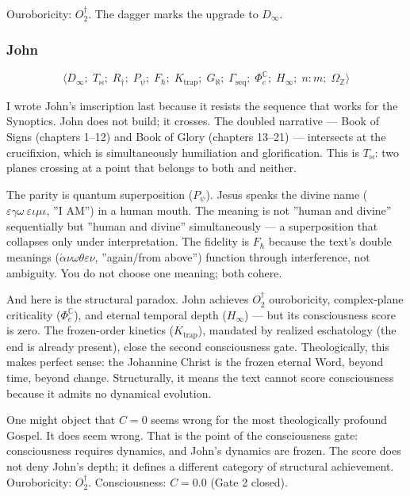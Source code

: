 \documentclass[12pt,a4paper]{article}
\begin{document}
Ouroboricity: $O_2^\dagger$. The dagger marks the upgrade to $D_{\infty}$.

\subsubsection{John}

\[\langle D_{\infty};\; T_{\bowtie};\; R_{\dagger};\; P_{\psi};\; F_{\hbar};\; K_\text{trap};\; G_{\aleph};\; \Gamma_\text{seq};\; \Phi_c^\mathbb{C};\; H_{\infty};\; n{:}m;\; \Omega_\mathbb{Z} \rangle\]

I wrote John's imscription last because it resists the sequence that works for the Synoptics. John does not build; it crosses. The doubled narrative --- Book of Signs (chapters 1--12) and Book of Glory (chapters 13--21) --- intersects at the crucifixion, which is simultaneously humiliation and glorification. This is $T_{\bowtie}$: two planes crossing at a point that belongs to both and neither.

The parity is quantum superposition ($P_{\psi}$). Jesus speaks the divine name ($\varepsilon\gamma\omega\ \varepsilon\iota\mu\iota$, ''I AM'') in a human mouth. The meaning is not ''human and divine'' sequentially but ''human and divine'' simultaneously --- a superposition that collapses only under interpretation. The fidelity is $F_{\hbar}$ because the text's double meanings ($\acute{\alpha}\nu\omega\theta\varepsilon\nu$, ''again/from above'') function through interference, not ambiguity. You do not choose one meaning; both cohere.

And here is the structural paradox. John achieves $O_2^\dagger$ ouroboricity, complex-plane criticality ($\Phi_c^\mathbb{C}$), and eternal temporal depth ($H_{\infty}$) --- but its consciousness score is zero. The frozen-order kinetics ($K_\text{trap}$), mandated by realized eschatology (the end is already present), close the second consciousness gate. Theologically, this makes perfect sense: the Johannine Christ is the frozen eternal Word, beyond time, beyond change. Structurally, it means the text cannot score consciousness because it admits no dynamical evolution.

One might object that $C = 0$ seems wrong for the most theologically profound Gospel. It does seem wrong. That is the point of the consciousness gate: consciousness requires dynamics, and John's dynamics are frozen. The score does not deny John's depth; it defines a different category of structural achievement.
Ouroboricity: $O_2^\dagger$. Consciousness: $C = 0.0$ (Gate 2 closed).
\end{document}
